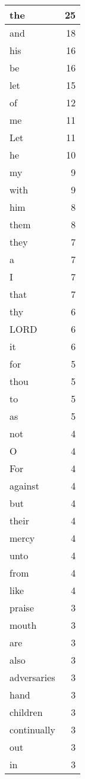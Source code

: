 \begin{center}
\begin{longtable}{l|r}
\hline \hline
\endlastfoot
the & 25 \\ \hline
and & 18 \\ \hline
his & 16 \\ \hline
be & 16 \\ \hline
let & 15 \\ \hline
of & 12 \\ \hline
me & 11 \\ \hline
Let & 11 \\ \hline
he & 10 \\ \hline
my & 9 \\ \hline
with & 9 \\ \hline
him & 8 \\ \hline
them & 8 \\ \hline
they & 7 \\ \hline
a & 7 \\ \hline
I & 7 \\ \hline
that & 7 \\ \hline
thy & 6 \\ \hline
LORD & 6 \\ \hline
it & 6 \\ \hline
for & 5 \\ \hline
thou & 5 \\ \hline
to & 5 \\ \hline
as & 5 \\ \hline
not & 4 \\ \hline
O & 4 \\ \hline
For & 4 \\ \hline
against & 4 \\ \hline
but & 4 \\ \hline
their & 4 \\ \hline
mercy & 4 \\ \hline
unto & 4 \\ \hline
from & 4 \\ \hline
like & 4 \\ \hline
praise & 3 \\ \hline
mouth & 3 \\ \hline
are & 3 \\ \hline
also & 3 \\ \hline
adversaries & 3 \\ \hline
hand & 3 \\ \hline
children & 3 \\ \hline
continually & 3 \\ \hline
out & 3 \\ \hline
in & 3 \\ \hline

\end{longtable}
\end{center}
